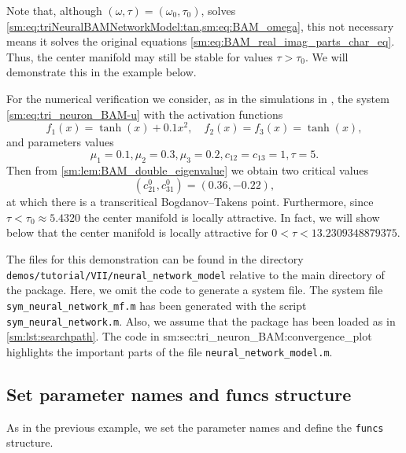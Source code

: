 \begin{remark}
    Note that, although $(\omega,\tau) = (\omega_0,\tau_0)$, solves \cref{sm:eq:triNeuralBAMNetworkModel:tan,sm:eq:BAM_omega},
    this not necessary means it solves the original equations \cref{sm:eq:BAM_real_imag_parts_char_eq}.
    Thus, the center manifold may still be stable for values $\tau>\tau_0$. We will demonstrate this
    in the example below.
\end{remark}

For the numerical verification we consider, as in the simulations in
\cite[Example 1]{dong2013bogdanov}, the system \cref{sm:eq:tri_neuron_BAM-u} with
the activation functions
\begin{equation}
    \label{sm:eq:triNeuralBAMNetworkModelFunctions}
    f_{1}(x)=\tanh(x)+0.1x^{2},\quad f_{2}(x)=f_{3}(x)=\tanh(x),
\end{equation}
and parameters values
\begin{equation}
    \label{sm:eq:triNeuralBAMNetworkModelFixedParameters}
    \mu_{1}=0.1,\mu_{2}=0.3,\mu_{3}=0.2,c_{12}=c_{13}=1,\tau=5.
\end{equation}
Then from \cref{sm:lem:BAM_double_eigenvalue} we obtain two critical
values 
\[
(c_{21}^{0},c_{31}^{0})=(0.36,-0.22),
\]
at which there is a transcritical Bogdanov--Takens point. Furthermore, since
$\tau < \tau_0 \approx 5.4320$ the center manifold is locally attractive. In
fact, we will show below that the center manifold is locally attractive for
$0<\tau<13.2309348879375$.

\begin{remark}
    The \MATLAB files for this demonstration can be found in the directory
    \texttt{demos/tutorial/VII/neural_network_model} relative to the main
    directory of the \DDEBIFTOOL package. Here, we omit the code to generate a
    system file. The system file\\
    \texttt{sym_neural_network_mf.m} has been
    generated with the script \texttt{sym_neural_network.m}. Also, we assume
    that the \DDEBIFTOOL package has been loaded as in
    \cref{sm:lst:searchpath}. The code in
              {sm:sec:tri_neuron_BAM:convergence_plot}
    highlights the important parts of the file
    \texttt{neural_network_model.m}. 
\end{remark}

\subsection{Set parameter names and funcs structure} 
\label{sm:sec:tri_neuron_BAM:pars_and_funcs}
As in the previous example, we set the parameter names and define the \texttt{funcs} structure.
\inputminted[firstline=27, lastline=33]{MATLAB}{\pathToDDEBifToolDemos/BAM_neural_network_model/BAMnn.m}


